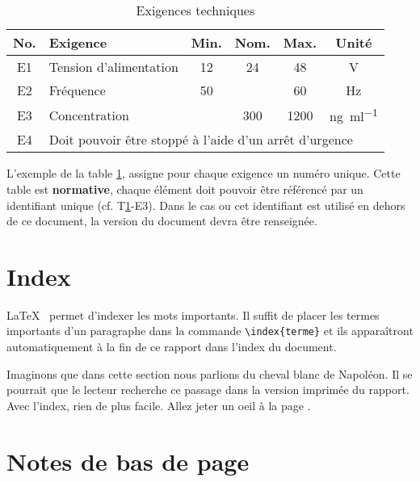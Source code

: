 \begin{table}[h]
    \begin{center}
        \caption{Exigences techniques \label{specification}}
        \begin{tabularx}{\textwidth}{cXcccc}
            No. & Exigence                                                                   & Min. & Nom. & Max. & Unité                           \\ \toprule
            E1  & Tension d'alimentation                                                     & 12   & 24   & 48   & \si{\volt}                      \\ \midrule
            E2  & Fréquence                                                                  & 50   &      & 60   & \si{\hertz}                     \\ \midrule
            E3  & Concentration                                                              &      & 300  & 1200 & \si{\nano\gram\per\milli\litre} \\ \midrule
            E4  & \multicolumn{5}{l}{Doit pouvoir être stoppé à l'aide d'un arrêt d'urgence}
        \end{tabularx}
    \end{center}
\end{table}

L'exemple de la table \ref{specification}, assigne pour chaque exigence un numéro unique. Cette table est \textbf{normative}, chaque élément doit pouvoir être référencé par un identifiant unique (cf. T\ref{specification}-E3). Dans le cas ou cet identifiant est utilisé en dehors de ce document, la version du document devra être renseignée.

\section{Index}
\LaTeX~ permet d'indexer les mots  importants. Il suffit de placer les termes importants d'un paragraphe dans la commande \texttt{\textbackslash index\{terme\}} et ils apparaîtront automatiquement à la fin de ce rapport dans l'index du document.


Imaginons que dans cette section nous parlions du cheval blanc  de Napoléon. Il se pourrait que le lecteur recherche ce passage dans la version imprimée du rapport. Avec l'index, rien de plus facile. Allez jeter un oeil à la page \pageref{index}.

\section{Notes de bas de page}

